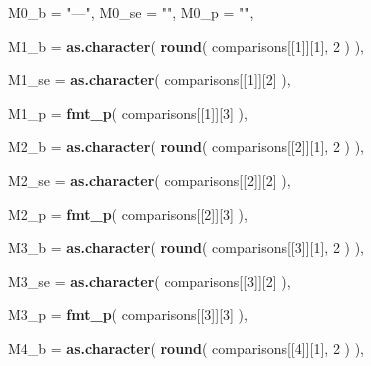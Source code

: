 \documentclass[
]{article}
\newenvironment{Shaded}{\begin{snugshade}}{\end{snugshade}}
\newcommand{\AttributeTok}[1]{\textcolor[rgb]{0.13,0.29,0.53}{#1}}
\newcommand{\DecValTok}[1]{\textcolor[rgb]{0.00,0.00,0.81}{#1}}
\newcommand{\FunctionTok}[1]{\textcolor[rgb]{0.13,0.29,0.53}{\textbf{#1}}}
\newcommand{\NormalTok}[1]{#1}
\newcommand{\StringTok}[1]{\textcolor[rgb]{0.31,0.60,0.02}{#1}}
\begin{document}
\begin{Shaded}
\begin{Highlighting}[]
      \AttributeTok{M0\_b =} \StringTok{"—"}\NormalTok{,}
      \AttributeTok{M0\_se =} \StringTok{""}\NormalTok{,}
      \AttributeTok{M0\_p =} \StringTok{""}\NormalTok{,}

      \AttributeTok{M1\_b =}
        \FunctionTok{as.character}\NormalTok{(}
          \FunctionTok{round}\NormalTok{(}
\NormalTok{            comparisons[[}\DecValTok{1}\NormalTok{]][}\DecValTok{1}\NormalTok{],}
            \DecValTok{2}
\NormalTok{          )}
\NormalTok{        ),}

      \AttributeTok{M1\_se =}
        \FunctionTok{as.character}\NormalTok{(}
\NormalTok{          comparisons[[}\DecValTok{1}\NormalTok{]][}\DecValTok{2}\NormalTok{]}
\NormalTok{        ),}

      \AttributeTok{M1\_p =}
        \FunctionTok{fmt\_p}\NormalTok{(}
\NormalTok{          comparisons[[}\DecValTok{1}\NormalTok{]][}\DecValTok{3}\NormalTok{]}
\NormalTok{        ),}

      \AttributeTok{M2\_b =}
        \FunctionTok{as.character}\NormalTok{(}
          \FunctionTok{round}\NormalTok{(}
\NormalTok{            comparisons[[}\DecValTok{2}\NormalTok{]][}\DecValTok{1}\NormalTok{],}
            \DecValTok{2}
\NormalTok{          )}
\NormalTok{        ),}

      \AttributeTok{M2\_se =}
        \FunctionTok{as.character}\NormalTok{(}
\NormalTok{          comparisons[[}\DecValTok{2}\NormalTok{]][}\DecValTok{2}\NormalTok{]}
\NormalTok{        ),}

      \AttributeTok{M2\_p =}
        \FunctionTok{fmt\_p}\NormalTok{(}
\NormalTok{          comparisons[[}\DecValTok{2}\NormalTok{]][}\DecValTok{3}\NormalTok{]}
\NormalTok{        ),}

      \AttributeTok{M3\_b =}
        \FunctionTok{as.character}\NormalTok{(}
          \FunctionTok{round}\NormalTok{(}
\NormalTok{            comparisons[[}\DecValTok{3}\NormalTok{]][}\DecValTok{1}\NormalTok{],}
            \DecValTok{2}
\NormalTok{          )}
\NormalTok{        ),}

      \AttributeTok{M3\_se =}
        \FunctionTok{as.character}\NormalTok{(}
\NormalTok{          comparisons[[}\DecValTok{3}\NormalTok{]][}\DecValTok{2}\NormalTok{]}
\NormalTok{        ),}

      \AttributeTok{M3\_p =}
        \FunctionTok{fmt\_p}\NormalTok{(}
\NormalTok{          comparisons[[}\DecValTok{3}\NormalTok{]][}\DecValTok{3}\NormalTok{]}
\NormalTok{        ),}

      \AttributeTok{M4\_b =}
        \FunctionTok{as.character}\NormalTok{(}
          \FunctionTok{round}\NormalTok{(}
\NormalTok{            comparisons[[}\DecValTok{4}\NormalTok{]][}\DecValTok{1}\NormalTok{],}
            \DecValTok{2}
\NormalTok{          )}
\NormalTok{        ),}


\end{Highlighting}
\end{Shaded}
\end{document}
